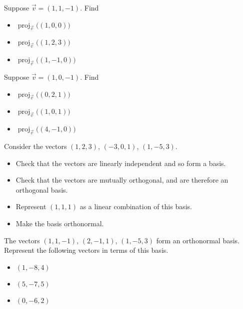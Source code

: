 \documentclass{ximera}
\begin{document}
\begin{exercise}
    Suppose $\vec{v} = (1,1,-1)$.  Find
    \begin{itemize}
        \item $\operatorname{proj}_{\vec{v}}\bigl( (1,0,0) \bigr)$
        \item $\operatorname{proj}_{\vec{v}}\bigl( (1,2,3) \bigr)$
        \item $\operatorname{proj}_{\vec{v}}\bigl( (1,-1,0) \bigr)$
    \end{itemize}
\end{exercise}

\begin{exercise}
    Suppose $\vec{v} = (1,0,-1)$.  Find
    \begin{itemize}
        \item $\operatorname{proj}_{\vec{v}}\bigl( (0,2,1) \bigr)$
        \item $\operatorname{proj}_{\vec{v}}\bigl( (1,0,1) \bigr)$
        \item $\operatorname{proj}_{\vec{v}}\bigl( (4,-1,0) \bigr)$
    \end{itemize}
\end{exercise}

\begin{exercise}
    Consider the vectors $(1,2,3)$, $(-3,0,1)$, $(1,-5,3)$.
    \begin{itemize}
        \item Check that the vectors are linearly independent and so form a basis.
        \item Check that the vectors are mutually orthogonal, and are therefore an orthogonal basis.
        \item Represent $(1,1,1)$ as a linear combination of this basis.
        \item Make the basis orthonormal.
    \end{itemize}
\end{exercise}


\begin{exercise}
    The vectors $(1,1,-1)$, $(2,-1,1)$, $(1,-5,3)$ form an orthonormal basis. Represent the following vectors in terms of this basis.
    \begin{itemize}
        \item $(1,-8,4)$
        \item $(5,-7,5)$
        \item $(0,-6,2)$
    \end{itemize}
\end{exercise}
\end{document}
